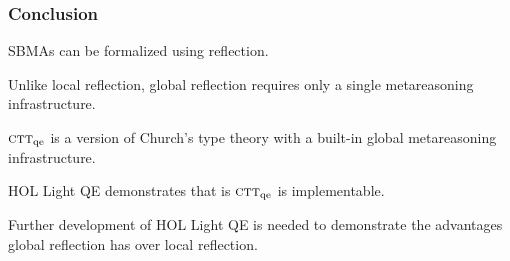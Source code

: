 \documentclass[t,12pt,numbers,fleqn]{beamer}
\newcommand{\churchqe}{$\mbox{\sc ctt}_{\rm qe}$}
\begin{document}
\begin{frame}\label{lastframe}
\frametitle{Conclusion}
\be

  \item SBMAs can be formalized using reflection.

  \item Unlike local reflection, global reflection requires only a
    single metareasoning infrastructure.

  \item {\churchqe} is a version of Church's type theory with a
    built-in global metareasoning infrastructure.

  \item HOL Light QE demonstrates that is {\churchqe} is
    implementable.

  \item Further development of HOL Light QE is needed to demonstrate
    the advantages global reflection has over local reflection.

\ee

\vfill
\bc
{}
\ec
\vfill

\end{frame}

\iffalse


\begin{frame}
\frametitle{}
\bi

  \item 

\ei
\end{frame}

\fi
\end{document}
